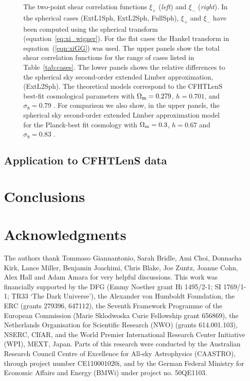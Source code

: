 \documentclass[fleqn,usenatbib]{mnras} %
\begin{document}
\begin{figure}
  \caption{The two-point shear correlation functions $\xi_+$ (\emph{left}) and $\xi_-$ (\emph{right}).
  In the spherical cases (ExtL1Sph, ExtL2Sph, FullSph), $\xi_+$ and $\xi_-$ have been computed using the spherical
  transform (equation~\ref{eq:xi_wigner}). For the flat cases the Hankel transform
  in equation~(\ref{eqn:xiGG}) was used.
  The upper panels
  show the total shear correlation functions for the range of cases listed in Table~\ref{tab:cases}.
    The lower panels shows the relative differences to the spherical sky second-order extended Limber approximation, (ExtL2Sph).
     The theoretical models correspond to the CFHTLenS best-fit cosmological parameters with
    $\Omega_{\rm m} = 0.279$, $h=0.701$, and $\sigma_8 = 0.79$ \citep{CFHTLenS-2pt-notomo}.  For comparison we
    	also show, in the upper panels, the spherical sky second-order extended Limber approximation model for the Planck-best fit
    cosmology with $\Omega_{\rm m} = 0.3$, $h=0.67$ and $\sigma_8 = 0.83$ \citep{2015arXiv150201589P}.
  }

  \label{fig:xi_pm}

\end{figure}



\subsection{Application to CFHTLenS data}
\label{sec:cfhtlens}






\section{Conclusions}


\section*{Acknowledgments}

The authors thank Tommaso Giannantonio, Sarah Bridle, Ami Choi, Donnacha Kirk,
Lance Miller, Benjamin Joachimi, Chris Blake, Joe Zuntz, Joanne Cohn, Alex Hall and Adam Amara for very helpful
discussions. This work was financially supported by the DFG (Emmy Noether grant
Hi 1495/2-1; SI 1769/1-1; TR33 `The Dark Universe'), the Alexander von Humboldt
Foundation, the ERC (grants 279396, 647112), the Seventh Framework Programme of
the European Commission (Marie Sklodwoska Curie Fellowship grant 656869), the
Netherlands Organisation for Scientific Research (NWO) (grants 614.001.103),
NSERC, CIfAR, and the World Premier International Research Center Initiative
(WPI), MEXT, Japan. Parts of this research were conducted by the Australian
Research Council Centre of Excellence for All-sky Astrophysics (CAASTRO),
through project number CE110001020i, and by the German Federal
Ministry for Economic Affairs and Energy (BMWi) under
project no. 50QE1103.
\end{document}
